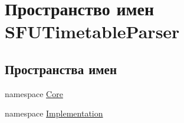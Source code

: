 \hypertarget{namespace_s_f_u_timetable_parser}{}\section{Пространство имен S\+F\+U\+Timetable\+Parser}
\label{namespace_s_f_u_timetable_parser}
\subsection*{Пространства имен}
\begin{DoxyCompactItemize}
\item 
namespace \hyperlink{namespace_s_f_u_timetable_parser_1_1_core}{Core}
\item 
namespace \hyperlink{namespace_s_f_u_timetable_parser_1_1_implementation}{Implementation}
\end{DoxyCompactItemize}
